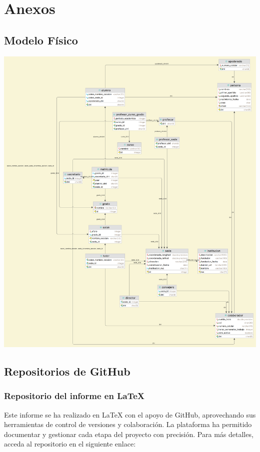 \section{Anexos}
\subsection{Modelo Físico}
\begin{center}
	\includegraphics[width=\linewidth, height=0.75\textheight, keepaspectratio]{figures/modelo_fisico.png}
\end{center}
\subsection{Repositorios de GitHub}
\subsubsection{Repositorio del informe en LaTeX}{
	Este informe se ha realizado en LaTeX con el apoyo de GitHub, aprovechando sus herramientas de control de versiones y colaboración. La plataforma ha permitido documentar y gestionar cada etapa del proyecto con precisión. Para más detalles, acceda al repositorio en el siguiente enlace: 
}
